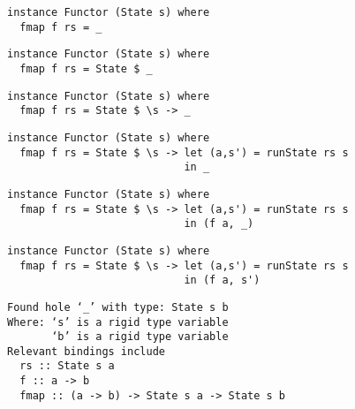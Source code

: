 \documentclass{beamer}
\begin{document}
\begin{frame}[fragile]
\begin{overprint}
\begin{verbatim}
instance Functor (State s) where
  fmap f rs = _

\end{verbatim}
\begin{verbatim}
instance Functor (State s) where
  fmap f rs = State $ _

\end{verbatim}
\begin{verbatim}
instance Functor (State s) where
  fmap f rs = State $ \s -> _

\end{verbatim}
\begin{verbatim}
instance Functor (State s) where
  fmap f rs = State $ \s -> let (a,s') = runState rs s
                            in _
\end{verbatim}
\begin{verbatim}
instance Functor (State s) where
  fmap f rs = State $ \s -> let (a,s') = runState rs s
                            in (f a, _)
\end{verbatim}
\begin{verbatim}
instance Functor (State s) where
  fmap f rs = State $ \s -> let (a,s') = runState rs s
                            in (f a, s')
\end{verbatim}
\end{overprint}
\bigskip
\scriptsize
\begin{overprint}
\begin{verbatim}
Found hole ‘_’ with type: State s b
Where: ‘s’ is a rigid type variable
       ‘b’ is a rigid type variable
Relevant bindings include
  rs :: State s a
  f :: a -> b
  fmap :: (a -> b) -> State s a -> State s b
\end{verbatim}


\end{overprint}
\end{frame}
\end{document}
